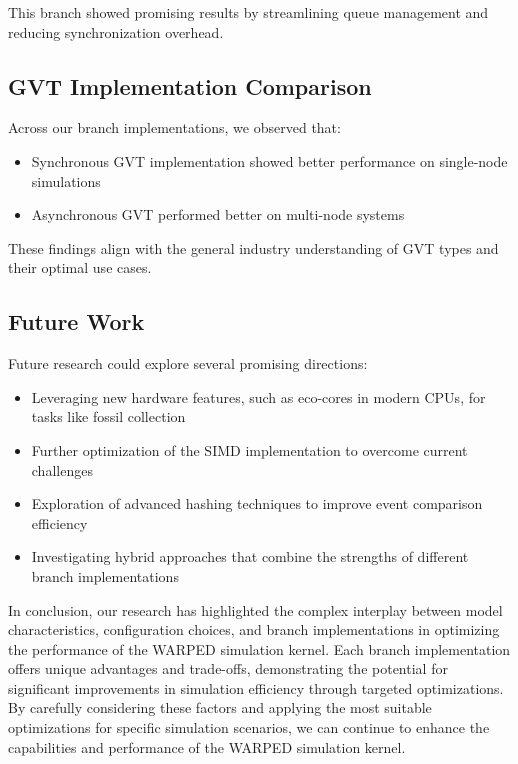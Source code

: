 This branch showed promising results by streamlining queue management and reducing synchronization overhead.

\subsection{GVT Implementation Comparison}

Across our branch implementations, we observed that:

\begin{itemize}
    \item Synchronous GVT implementation showed better performance on single-node simulations
    \item Asynchronous GVT performed better on multi-node systems
\end{itemize}

These findings align with the general industry understanding of GVT types and their optimal use cases.

\subsection{Future Work}

Future research could explore several promising directions:

\begin{itemize}
    \item Leveraging new hardware features, such as eco-cores in modern CPUs, for tasks like fossil collection
    \item Further optimization of the SIMD implementation to overcome current challenges
    \item Exploration of advanced hashing techniques to improve event comparison efficiency
    \item Investigating hybrid approaches that combine the strengths of different branch implementations
\end{itemize}

In conclusion, our research has highlighted the complex interplay between model characteristics, configuration choices, and branch implementations in optimizing the performance of the WARPED simulation kernel. Each branch implementation offers unique advantages and trade-offs, demonstrating the potential for significant improvements in simulation efficiency through targeted optimizations. By carefully considering these factors and applying the most suitable optimizations for specific simulation scenarios, we can continue to enhance the capabilities and performance of the WARPED simulation kernel.